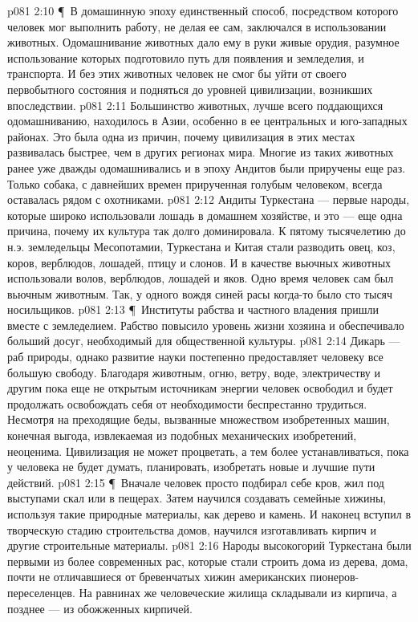\vs p081 2:10 \P\ В домашинную эпоху единственный способ, посредством которого человек мог выполнить работу, не делая ее сам, заключался в использовании животных. Одомашнивание животных дало ему в руки живые орудия, разумное использование которых подготовило путь для появления и земледелия, и транспорта. И без этих животных человек не смог бы уйти от своего первобытного состояния и подняться до уровней цивилизации, возникших впоследствии.
\vs p081 2:11 Большинство животных, лучше всего поддающихся одомашниванию, находилось в Азии, особенно в ее центральных и юго\hyp{}западных районах. Это была одна из причин, почему цивилизация в этих местах развивалась быстрее, чем в других регионах мира. Многие из таких животных ранее уже дважды одомашнивались и в эпоху Андитов были приручены еще раз. Только собака, с давнейших времен прирученная голубым человеком, всегда оставалась рядом с охотниками.
\vs p081 2:12 Андиты Туркестана --- первые народы, которые широко использовали лошадь в домашнем хозяйстве, и это --- еще одна причина, почему их культура так долго доминировала. К пятому тысячелетию до н.э. земледельцы Месопотамии, Туркестана и Китая стали разводить овец, коз, коров, верблюдов, лошадей, птицу и слонов. И в качестве вьючных животных использовали волов, верблюдов, лошадей и яков. Одно время человек сам был вьючным животным. Так, у одного вождя синей расы когда\hyp{}то было сто тысяч носильщиков.
\vs p081 2:13 \P\ Институты рабства и частного владения пришли вместе с земледелием. Рабство повысило уровень жизни хозяина и обеспечивало больший досуг, необходимый для общественной культуры.
\vs p081 2:14 Дикарь --- раб природы, однако развитие науки постепенно предоставляет человеку все большую свободу. Благодаря животным, огню, ветру, воде, электричеству и другим пока еще не открытым источникам энергии человек освободил и будет продолжать освобождать себя от необходимости беспрестанно трудиться. Несмотря на преходящие беды, вызванные множеством изобретенных машин, конечная выгода, извлекаемая из подобных механических изобретений, неоценима. Цивилизация не может процветать, а тем более устанавливаться, пока у человека не будет  думать, планировать, изобретать новые и лучшие пути действий.
\vs p081 2:15 \P\ Вначале человек просто подбирал себе кров, жил под выступами скал или в пещерах. Затем научился создавать семейные хижины, используя такие природные материалы, как дерево и камень. И наконец вступил в творческую стадию строительства домов, научился изготавливать кирпич и другие строительные материалы.
\vs p081 2:16 Народы высокогорий Туркестана были первыми из более современных рас, которые стали строить дома из дерева, дома, почти не отличавшиеся от бревенчатых хижин американских пионеров\hyp{}переселенцев. На равнинах же человеческие жилища складывали из кирпича, а позднее --- из обожженных кирпичей.
